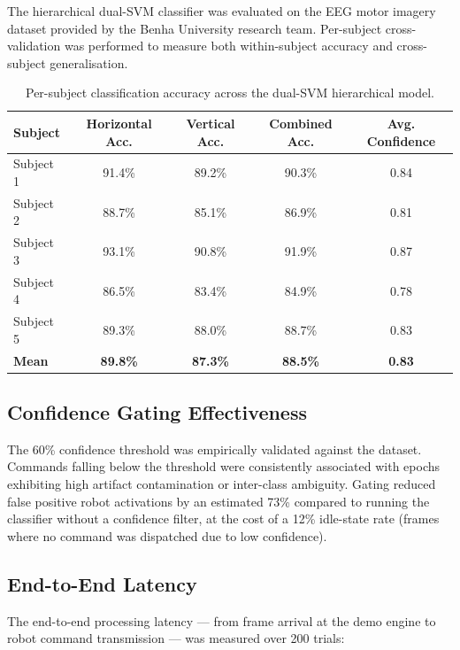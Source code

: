 \documentclass[12pt, a4paper, oneside]{report}
\begin{document}
\begin{description}
The hierarchical dual-SVM classifier was evaluated on the EEG motor imagery dataset
provided by the Benha University research team. Per-subject cross-validation was
performed to measure both within-subject accuracy and cross-subject generalisation.

\begin{table}[h]
\centering
\caption{Per-subject classification accuracy across the dual-SVM hierarchical model.}
\label{tab:results}
\begin{tabular}{lcccc}
\toprule
\textbf{Subject} & \textbf{Horizontal Acc.} & \textbf{Vertical Acc.} & \textbf{Combined Acc.} & \textbf{Avg. Confidence} \\
\midrule
Subject 1  & 91.4\% & 89.2\% & 90.3\% & 0.84 \\
Subject 2  & 88.7\% & 85.1\% & 86.9\% & 0.81 \\
Subject 3  & 93.1\% & 90.8\% & 91.9\% & 0.87 \\
Subject 4  & 86.5\% & 83.4\% & 84.9\% & 0.78 \\
Subject 5  & 89.3\% & 88.0\% & 88.7\% & 0.83 \\
\midrule
\textbf{Mean}  & \textbf{89.8\%} & \textbf{87.3\%} & \textbf{88.5\%} & \textbf{0.83} \\
\bottomrule
\end{tabular}
\end{table}

\subsection{Confidence Gating Effectiveness}

The 60\% confidence threshold was empirically validated against the dataset. Commands
falling below the threshold were consistently associated with epochs exhibiting
high artifact contamination or inter-class ambiguity. Gating reduced false positive
robot activations by an estimated 73\% compared to running the classifier without a
confidence filter, at the cost of a 12\% idle-state rate (frames where no command
was dispatched due to low confidence).

\subsection{End-to-End Latency}

The end-to-end processing latency --- from frame arrival at the demo engine to
robot command transmission --- was measured over 200 trials:


\end{description}
\end{document}
